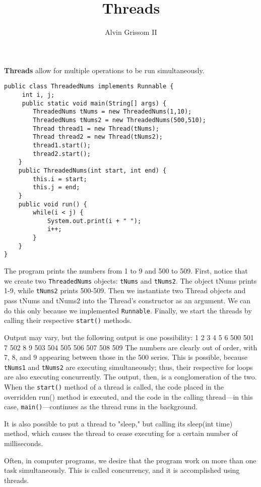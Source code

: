 \documentclass[12pt]{article}
\title{Threads}
\author{Alvin Grissom II}
\begin{document}
\maketitle

\textbf{Threads} allow for multiple operations to be run simultaneously.
\begin{verbatim}
public class ThreadedNums implements Runnable {
     int i, j;
     public static void main(String[] args) {
        ThreadedNums tNums = new ThreadedNums(1,10);
        ThreadedNums tNums2 = new ThreadedNums(500,510);
        Thread thread1 = new Thread(tNums);
        Thread thread2 = new Thread(tNums2);
        thread1.start();
        thread2.start();
    }
    public ThreadedNums(int start, int end) {
        this.i = start;
        this.j = end;
    }
    public void run() {
        while(i < j) {
            System.out.print(i + " ");
            i++;
        }
    }
}
\end{verbatim}
The program prints the numbers from 1 to 9 and 500 to 509.  First,
notice that we create two \texttt{ThreadedNums} objects:
\texttt{tNums} and \texttt{tNums2}.  The object tNums prints 1-9,
while \texttt{tNums2} prints 500-509.  Then we instantiate two Thread
objects and pass tNums and tNums2 into the Thread's constructor as an
argument.  We can do this only because we implemented
\texttt{Runnable}.  Finally, we start the threads by calling their
respective \texttt{start()} methods.

Output may vary, but the following output is one possibility: 1 2 3 4
5 6 500 501 7 502 8 9 503 504 505 506 507 508 509 The numbers are
clearly out of order, with 7, 8, and 9 appearing between those in the
500 series.  This is possible, because \texttt{tNums1} and
\texttt{tNums2} are executing simultaneously; thus, their respective
for loops are also executing concurrently.  The output, then, is a
conglomeration of the two.  When the \texttt{start()} method of a
thread is called, the code placed in the overridden run() method is
executed, and the code in the calling thread---in this case,
\texttt{main()}---continues as the thread runs in the background.

It is also possible to put a thread to "sleep," but calling its
sleep(int time) method, which causes the thread to cease executing for
a certain number of milliseconds.

Often, in computer programs, we desire that the program work on more
than one task simultaneously.  This is called concurrency, and it is
accomplished using threads.
\end{document}
